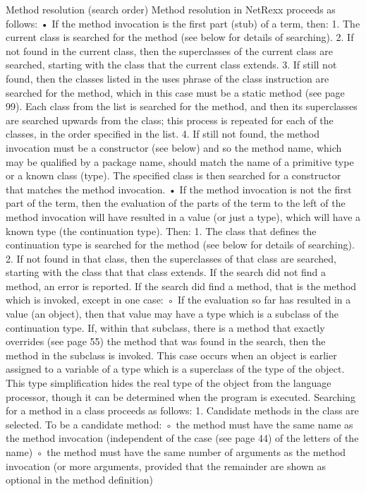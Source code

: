 Method resolution (search order)
Method resolution in NetRexx proceeds as follows:
• If the method invocation is the first part (stub) of a term, then:
1. The current class is searched for the method (see below for details of searching).
2. If not found in the current class, then the superclasses of the current class are searched, starting with the class that the current class extends.
3. If still not found, then the classes listed in the uses phrase of the class instruction are searched for the method, which in this case must be a static method (see page 99). Each class from the list is searched for the method, and then its superclasses are searched upwards from the class; this process is repeated for each of the classes, in the order specified in the list.
4. If still not found, the method invocation must be a constructor (see below) and so the method name, which may be qualified by a package name, should match the name of a primitive type or a known class (type). The specified class is then searched for a constructor that matches the method invocation.
• If the method invocation is not the first part of the term, then the evaluation of the parts of the term to the left of the method invocation will have resulted in a value (or just a type), which will have a known type (the continuation type). Then:
1. The class that defines the continuation type is searched for the method (see below for details of searching).
2. If not found in that class, then the superclasses of that class are searched, starting with the class that that class extends.
If the search did not find a method, an error is reported.
If the search did find a method, that is the method which is invoked, except in one case:
◦ If the evaluation so far has resulted in a value (an object), then that value may have a type which is a subclass of the continuation type. If, within that subclass, there is a method that exactly overrides (see page 55) the method that was found in the search, then the method in the subclass is invoked.
This case occurs when an object is earlier assigned to a variable of a type which is a superclass of the type of the object. This type simplification hides the real type of the object from the language processor, though it can be determined when the program is executed.
Searching for a method in a class proceeds as follows:
1. Candidate methods in the class are selected. To be a candidate method:
◦ the method must have the same name as the method invocation (independent of the case (see page 44) of the letters of the name)
◦ the method must have the same number of arguments as the method invocation (or more arguments, provided that the remainder are shown as optional in the method definition)
